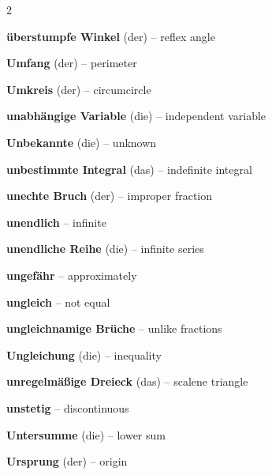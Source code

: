 \begin{multicols}{2}
\par\nopagebreak
\textbf{überstumpfe Winkel} (der) -- reflex angle\dotfill\hyperref[e:161]{\pageref*{e:161}}\par
\textbf{Umfang} (der) -- perimeter\dotfill\hyperref[e:209]{\pageref*{e:209}}\par
\textbf{Umkreis} (der) -- circumcircle\dotfill\hyperref[e:194]{\pageref*{e:194}}\par
\textbf{unabhängige Variable} (die) -- independent variable\dotfill\hyperref[e:106]{\pageref*{e:106}}\par
\textbf{Unbekannte} (die) -- unknown\dotfill\hyperref[e:73]{\pageref*{e:73}}\par
\textbf{unbestimmte Integral} (das) -- indefinite integral\dotfill\hyperref[e:287]{\pageref*{e:287}}\par
\textbf{unechte Bruch} (der) -- improper fraction\dotfill\hyperref[e:32]{\pageref*{e:32}}\par
\textbf{unendlich} -- infinite\dotfill\hyperref[e:70]{\pageref*{e:70}}\par
\textbf{unendliche Reihe} (die) -- infinite series\dotfill\hyperref[e:266]{\pageref*{e:266}}\par
\textbf{ungefähr} -- approximately\dotfill\hyperref[e:69]{\pageref*{e:69}}\par
\textbf{ungleich} -- not equal\dotfill\hyperref[e:61]{\pageref*{e:61}}\par
\textbf{ungleichnamige Brüche} -- unlike fractions\dotfill\hyperref[e:35]{\pageref*{e:35}}\par
\textbf{Ungleichung} (die) -- inequality\dotfill\hyperref[e:77]{\pageref*{e:77}}\par
\textbf{unregelmäßige Dreieck} (das) -- scalene triangle\dotfill\hyperref[e:180]{\pageref*{e:180}}\par
\textbf{unstetig} -- discontinuous\dotfill\hyperref[e:269]{\pageref*{e:269}}\par
\textbf{Untersumme} (die) -- lower sum\dotfill\hyperref[e:294]{\pageref*{e:294}}\par
\textbf{Ursprung} (der) -- origin\dotfill\hyperref[e:115]{\pageref*{e:115}}\par


\end{multicols}
